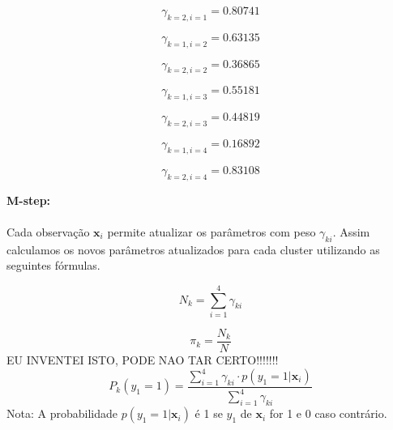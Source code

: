 \documentclass[a4paper,12pt]{article} %
\begin{document}
\begin{enumerate}
\begin{equation*}
    \gamma_{k=2,i=1} = 0.80741
\end{equation*}

\begin{equation*}
    \gamma_{k=1,i=2} = 0.63135
\end{equation*}

\begin{equation*}
    \gamma_{k=2,i=2} = 0.36865
\end{equation*}

\begin{equation*}
    \gamma_{k=1,i=3} = 0.55181
\end{equation*}

\begin{equation*}
    \gamma_{k=2,i=3} = 0.44819
\end{equation*}

\begin{equation*}
    \gamma_{k=1,i=4} = 0.16892
\end{equation*}

\begin{equation*}
    \gamma_{k=2,i=4} = 0.83108
\end{equation*}

\textbf{M-step:} \\ \\
Cada observação $\mathbf{x}_i$ permite atualizar os parâmetros com peso $\gamma_{ki}$. 
Assim calculamos os novos parâmetros atualizados para cada cluster utilizando as seguintes fórmulas. 

\begin{equation}
    N_k = \sum_{i=1}^4 \gamma_{ki}
\end{equation}

\begin{equation}
    \pi_k = \frac{N_k}{N}
\end{equation}
EU INVENTEI ISTO, PODE NAO TAR CERTO!!!!!!!
\begin{equation}
    P_k(y_1=1) = \frac{\sum_{i=1}^4 \gamma_{ki} \cdot p(y_1=1|\mathbf{x}_i)}{\sum_{i=1}^4 \gamma_{ki}} 
\end{equation}
Nota: A probabilidade $p(y_1=1|\mathbf{x}_i)$ é 1 se $y_1$ de $\mathbf{x}_i$ for 1 e 0 caso contrário. 


\end{enumerate}
\end{document}
